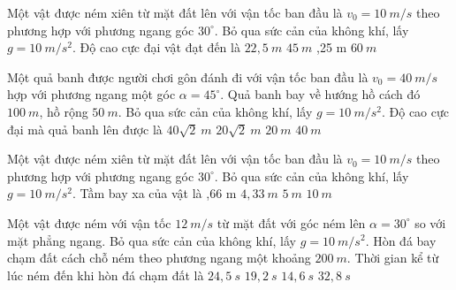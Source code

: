 \begin{ex}%
Một vật được ném xiên từ mặt đất lên với vận tốc ban đầu là $v_0=10\ m/s$ theo phương hợp với phương ngang góc $30^\circ$.  Bỏ qua sức cản của không khí, lấy $g=10\ m/s^2$. Độ cao cực đại vật đạt đến là
\choice
{$22,5\ m$}
{$45\ m$}
{,25 m}
{$60\ m$}
 \end{ex}
\begin{ex}%
Một quả banh được người chơi gôn đánh đi với vận tốc ban đầu là $v_0=40\ m/s$ hợp với phương ngang một góc $\alpha=45^\circ$. Quả banh bay về hướng hồ cách đó $100\ m$, hồ rộng $50\ m$. Bỏ qua sức cản của không khí, lấy $g=10\ m/s^2$. Độ cao cực đại mà quả banh lên được là
\choice
{$40 \sqrt{2}\ m$}
{$20 \sqrt{2}\ m$}
{$20\ m$}
{\True $40\ m$}
 \end{ex}
\begin{ex}%
Một vật được ném xiên từ mặt đất lên với vận tốc ban đầu là $v_0=10\ m/s$ theo phương hợp với phương ngang góc $30^\circ$. Bỏ qua sức cản của không khí, lấy $g=10\ m/s^2$. Tầm bay xa của vật là
\choice
{,66 m}
{$4,33\ m$}
{$5\ m$}
{$10\ m$}
 \end{ex}
\begin{ex}%
Một vật được ném với vận tốc $12\ m/s$ từ mặt đất với góc ném lên $\alpha=30^\circ$ so với mặt phẳng ngang. Bỏ qua sức cản của không khí, lấy $g=10\ m/s^2$. Hòn đá bay chạm đất cách chỗ ném theo phương ngang một khoảng $200\ m$. Thời gian kể từ lúc ném đến khi hòn đá chạm đất là
\choice
{$24,5\ s$}
{\True $19,2\ s$}
{$14,6\ s$}
{$32,8\ s$}
 \end{ex}
